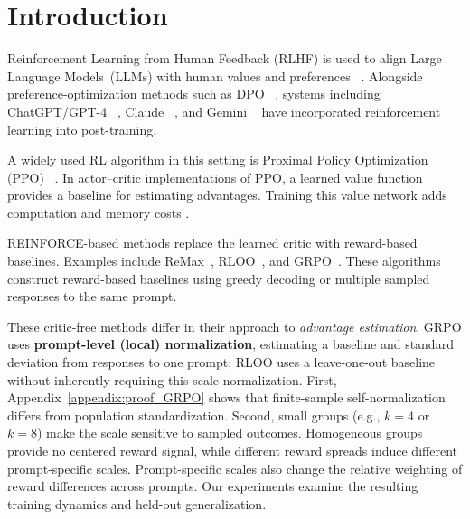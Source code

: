 \section{Introduction}

Reinforcement Learning from Human Feedback (RLHF) is used to align Large Language Models~(LLMs) with human values and preferences ~\citep{vemprala2023chatgpt,achiam2023gpt, Ouyang2022, shen2024policy,shen2025exploring,hu2024openrlhf}. Alongside preference-optimization methods such as DPO ~\citep{rafailov2023direct}, systems including ChatGPT/GPT-4 ~\citep{vemprala2023chatgpt, openai2023gpt4}, Claude ~\citep{anthropic2023introducing}, and Gemini ~\citep{team2023gemini} have incorporated reinforcement learning into post-training.

A widely used RL algorithm in this setting is Proximal Policy Optimization (PPO) ~\citep{schulman2017proximal}. In actor--critic implementations of PPO, a learned value function provides a baseline for estimating advantages. Training this value network adds computation and memory costs \citep{shao2024deepseekmath}.

REINFORCE-based methods replace the learned critic with reward-based baselines. Examples include ReMax~\citep{li2023remax}, RLOO~\citep{2024Back}, and GRPO~\citep{shao2024deepseekmath}. These algorithms construct reward-based baselines using greedy decoding or multiple sampled responses to the same prompt.

These critic-free methods differ in their approach to \textit{advantage estimation}. GRPO uses \textbf{prompt-level (local) normalization}, estimating a baseline and standard deviation from responses to one prompt; RLOO uses a leave-one-out baseline without inherently requiring this scale normalization. First, Appendix~\ref{appendix:proof_GRPO} shows that finite-sample self-normalization differs from population standardization. Second, small groups (e.g., $k=4$ or $k=8$) make the scale sensitive to sampled outcomes. Homogeneous groups provide no centered reward signal, while different reward spreads induce different prompt-specific scales. Prompt-specific scales also change the relative weighting of reward differences across prompts. Our experiments examine the resulting training dynamics and held-out generalization.

